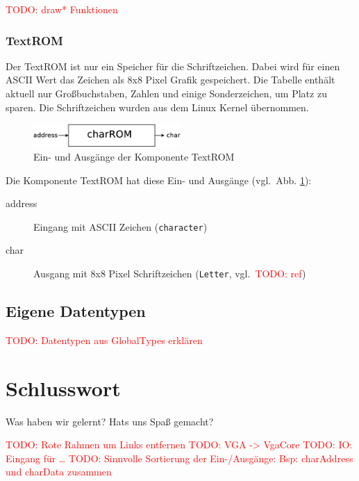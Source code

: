 \documentclass[IN,ngerman,utf8,12pt]{tumbook}
\newcommand\todo[1]{\textcolor{red}{TODO: #1}}
\newcommand{\vgl}{vgl.\ }
\begin{document}
\todo{draw* Funktionen}

\subsection{TextROM}

Der TextROM ist nur ein Speicher für die Schriftzeichen.
Dabei wird für einen ASCII Wert das Zeichen als 8x8 Pixel Grafik gespeichert.
Die Tabelle enthält aktuell nur Großbuchstaben, Zahlen und einige Sonderzeichen, um Platz zu sparen.
Die Schriftzeichen wurden aus dem Linux Kernel übernommen.

\begin{figure}[H]
    \centerline{
        \includegraphics[width=0.5\textwidth]{img/textROM}
    }
    \label{abb:textrom}
    \caption{Ein- und Ausgänge der Komponente TextROM}
\end{figure}

Die Komponente TextROM hat diese Ein- und Ausgänge (\vgl Abb. \ref{abb:textrom}):
\begin{description}
    \item[address] Eingang mit ASCII Zeichen (\texttt{character})
    \item[char] Ausgang mit 8x8 Pixel Schriftzeichen (\texttt{Letter}, \vgl \todo{ref})
\end{description}

\section{Eigene Datentypen}
\todo{Datentypen aus GlobalTypes erklären}

\chapter{Schlusswort}
Was haben wir gelernt? Hats uns Spaß gemacht?

\todo{Rote Rahmen um Links entfernen}
\todo{VGA -> VgaCore}
\todo{IO: Eingang für \ldots}
\todo{Sinnvolle Sortierung der Ein-/Ausgänge: Bsp: charAddress und charData zusammen}


\clearpage
\appendix%
\listoffigures%
\end{document}
